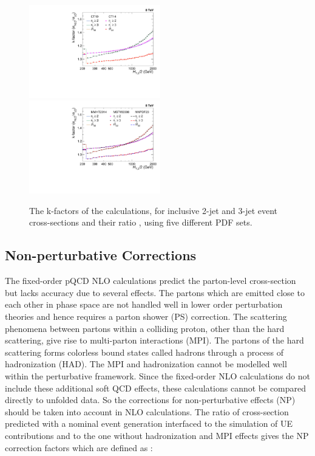 \begin{figure}[!htbp]
 \begin{center}
 \hspace*{-5mm}\includegraphics[width=0.51\textwidth]{Plots_HT_2_150/Kfactor_all_1.pdf}%
 ~~\includegraphics[width=0.51\textwidth]{Plots_HT_2_150/Kfactor_all_2.pdf}
 \caption[The k-factors using five different PDF sets.]{The k-factors of the \NLOJETPP calculations, for inclusive 2-jet and 3-jet event cross-sections and their ratio \ratio, using five different PDF sets.}
 \label{fig:kfactor}
 \end{center}
\end{figure}

\subsection{Non-perturbative Corrections}
\label{sec:NPcorr}

The fixed-order pQCD NLO calculations predict the parton-level cross-section but lacks accuracy due to several effects. The partons which are emitted close to each other in phase space are not handled well in lower order perturbation theories and hence requires a parton shower (PS) correction. The scattering phenomena between partons within a colliding proton, other than the hard scattering, give rise to multi-parton interactions (MPI). The partons of the hard scattering forms colorless bound states called hadrons through a process of hadronization (HAD). The MPI and hadronization cannot be modelled well within the perturbative framework. Since the fixed-order NLO calculations do not include these additional soft QCD effects, these calculations cannot be compared directly to unfolded data. So the corrections for non-perturbative effects (NP) should be taken into account in NLO calculations. The ratio of cross-section predicted with a nominal event generation interfaced to the simulation of UE contributions and to the one without hadronization and MPI effects gives the NP correction factors which are defined as : 

